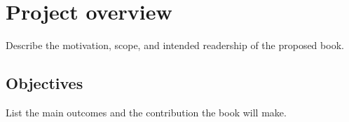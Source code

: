 \chapter{Project overview}
Describe the motivation, scope, and intended readership of the proposed book.
\section{Objectives}
List the main outcomes and the contribution the book will make.
